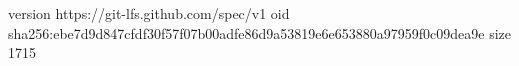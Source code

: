 version https://git-lfs.github.com/spec/v1
oid sha256:ebe7d9d847cfdf30f57f07b00adfe86d9a53819e6e653880a97959f0c09dea9e
size 1715
